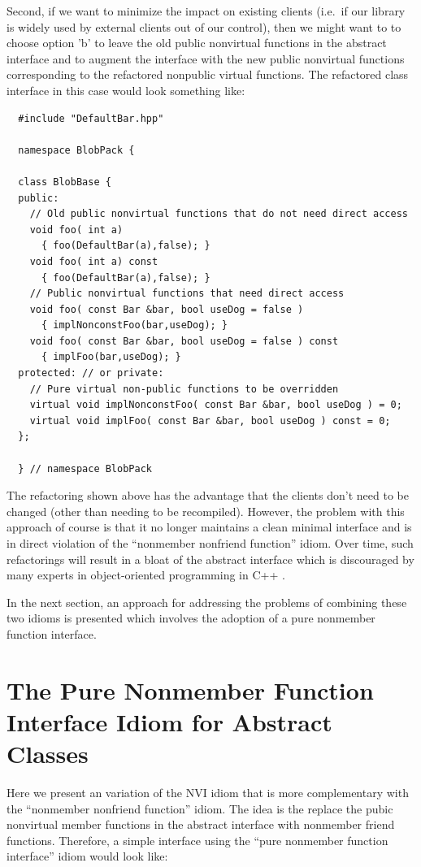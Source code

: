 \documentclass[pdf,ps2pdf,11pt]{SANDreport}
\begin{document}
Second, if we want to minimize the impact on existing clients (i.e.\ if our
library is widely used by external clients out of our control), then we might
want to to choose option 'b' to leave the old public nonvirtual functions in
the abstract interface and to augment the interface with the new public
nonvirtual functions corresponding to the refactored nonpublic virtual
functions.  The refactored class interface in this case would look something
like:

{\small\begin{verbatim}
  #include "DefaultBar.hpp"

  namespace BlobPack {

  class BlobBase {
  public:
    // Old public nonvirtual functions that do not need direct access
    void foo( int a)
      { foo(DefaultBar(a),false); }
    void foo( int a) const
      { foo(DefaultBar(a),false); }
    // Public nonvirtual functions that need direct access
    void foo( const Bar &bar, bool useDog = false )
      { implNonconstFoo(bar,useDog); }
    void foo( const Bar &bar, bool useDog = false ) const
      { implFoo(bar,useDog); }
  protected: // or private:
    // Pure virtual non-public functions to be overridden
    virtual void implNonconstFoo( const Bar &bar, bool useDog ) = 0;
    virtual void implFoo( const Bar &bar, bool useDog ) const = 0;
  };

  } // namespace BlobPack
\end{verbatim}}

The refactoring shown above has the advantage that the clients don't need to
be changed (other than needing to be recompiled).  However, the problem with
this approach of course is that it no longer maintains a clean minimal
interface and is in direct violation of the ``nonmember nonfriend function''
idiom.  Over time, such refactorings will result in a bloat of the abstract
interface which is discouraged by many experts in object-oriented programming
in C++ {}\cite[Item 33]{C++CodingStandards05}.

In the next section, an approach for addressing the problems of combining
these two idioms is presented which involves the adoption of a pure nonmember
function interface.

%
\section{The Pure Nonmember Function Interface Idiom for Abstract Classes}
%

Here we present an variation of the NVI idiom that is more complementary with
the ``nonmember nonfriend function'' idiom.  The idea is the replace the pubic
nonvirtual member functions in the abstract interface with nonmember friend
functions.  Therefore, a simple interface using the ``pure nonmember function
interface'' idiom would look like:
\end{document}
